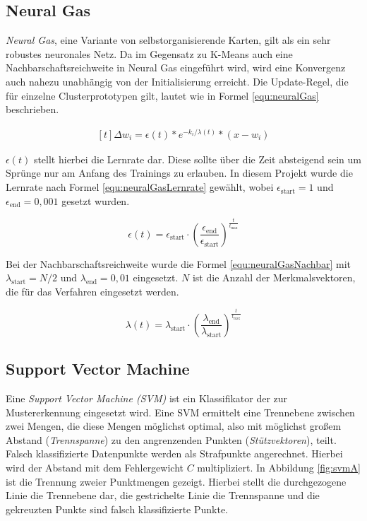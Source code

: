 \subsection{Neural Gas}
\emph{Neural Gas}, eine Variante von selbstorganisierende Karten, gilt als ein sehr robustes neuronales Netz. Da im Gegensatz zu K-Means auch eine Nachbarschaftsreichweite in Neural Gas eingeführt wird, wird eine Konvergenz auch nahezu unabhängig von der Initialisierung erreicht. \cite{bib:neuralGas} Die Update-Regel, die für einzelne Clusterprototypen gilt, lautet wie in Formel \ref{equ:neuralGas} beschrieben.

\begin{equation}
	\label{equ:neuralGas}
	\begin{aligned}[t]\Delta w_{i} = \epsilon(t) * e^{-k_i / \lambda(t)} * \left(x - w_i\right)\end{aligned}
\end{equation}

$\epsilon(t)$ stellt hierbei die Lernrate dar. Diese sollte über die Zeit absteigend sein um Sprünge nur am Anfang des Trainings zu erlauben. In diesem Projekt wurde die Lernrate nach Formel \ref{equ:neuralGasLernrate} gewählt, wobei $\epsilon_\text{start} = 1$ und $\epsilon_\text{end} = 0,001$ gesetzt wurden.

\begin{equation}
	\label{equ:neuralGasLernrate}
	\epsilon(t) = \epsilon_\text{start} \cdot \left( \frac{\epsilon_\text{end}} {\epsilon_\text{start}} \right) ^ {\frac{t}{t_{\text{max}}}}
\end{equation}

Bei der Nachbarschaftsreichweite wurde die Formel \ref{equ:neuralGasNachbar} mit $\lambda_\text{start} = N/2$ und $\lambda_\text{end} = 0,01$ eingesetzt. $N$ ist die Anzahl der Merkmalsvektoren, die für das Verfahren eingesetzt werden.

\begin{equation}
	\label{equ:neuralGasNachbar}
	 \lambda(t) = \lambda_\text{start} \cdot \left( \frac{\lambda_\text{end}} {\lambda_\text{start}} \right) ^ {\frac{t}{t_{\text{max}}}}
\end{equation}


\subsection{Support Vector Machine}
Eine \emph{Support Vector Machine (SVM)} ist ein Klassifikator der zur Mustererkennung eingesetzt wird. Eine SVM ermittelt eine Trennebene zwischen zwei Mengen, die diese Mengen möglichst optimal, also mit möglichst großem Abstand (\emph{Trennspanne}) zu den angrenzenden Punkten (\emph{Stützvektoren}), teilt. Falsch klassifizierte Datenpunkte werden als Strafpunkte angerechnet. Hierbei wird der Abstand mit dem Fehlergewicht $C$ multipliziert. In Abbildung \ref{fig:svmA} ist die Trennung zweier Punktmengen gezeigt. Hierbei stellt die durchgezogene Linie die Trennebene dar, die gestrichelte Linie die Trennspanne und die gekreuzten Punkte sind falsch klassifizierte Punkte.

